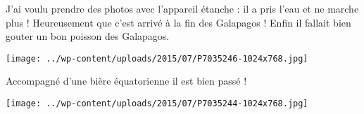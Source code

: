 J'ai voulu prendre des photos avec l'appareil étanche : il a pris l'eau et ne marche plus ! Heureusement que c'est arrivé à la fin des Galapagos !
\vfill
Enfin il fallait bien gouter un bon poisson des Galapagos. 
\vfill
\begin{center} \texttt{[image: ../wp-content/uploads/2015/07/P7035246-1024x768.jpg]} \end{center}
\vfill
Accompagné d'une bière équatorienne il est bien passé ! 
\vfill
\begin{center} \texttt{[image: ../wp-content/uploads/2015/07/P7035244-1024x768.jpg]} \end{center}
\vspace{-\topsep}
\vspace{-0.75mm}
